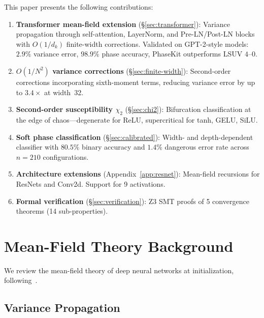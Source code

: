 \documentclass[10pt]{article}
\begin{document}
This paper presents the following contributions:
\begin{enumerate}[nosep]
    \item \textbf{Transformer mean-field extension} (\S\ref{sec:transformer}): Variance propagation through self-attention, LayerNorm, and Pre-LN/Post-LN blocks with $O(1/d_k)$ finite-width corrections. Validated on GPT-2-style models: $2.9\%$ variance error, $98.9\%$ phase accuracy, PhaseKit outperforms LSUV $4$--$0$.
    \item \textbf{$O(1/N^2)$ variance corrections} (\S\ref{sec:finite-width}): Second-order corrections incorporating sixth-moment terms, reducing variance error by up to $3.4\times$ at width~32.
    \item \textbf{Second-order susceptibility $\chi_2$} (\S\ref{sec:chi2}): Bifurcation classification at the edge of chaos---degenerate for ReLU, supercritical for tanh, GELU, SiLU.
    \item \textbf{Soft phase classification} (\S\ref{sec:calibrated}): Width- and depth-dependent classifier with $80.5\%$ binary accuracy and $1.4\%$ dangerous error rate across $n=210$ configurations.
    \item \textbf{Architecture extensions} (Appendix~\ref{app:resnet}): Mean-field recursions for ResNets and Conv2d. Support for 9 activations.
    \item \textbf{Formal verification} (\S\ref{sec:verification}): Z3 SMT proofs of 5 convergence theorems (14 sub-properties).
\end{enumerate}

\section{Mean-Field Theory Background}
\label{sec:mft}

We review the mean-field theory of deep neural networks at initialization, following~\cite{poole2016exponential,schoenholz2017deep}.

\subsection{Variance Propagation}
\end{document}
